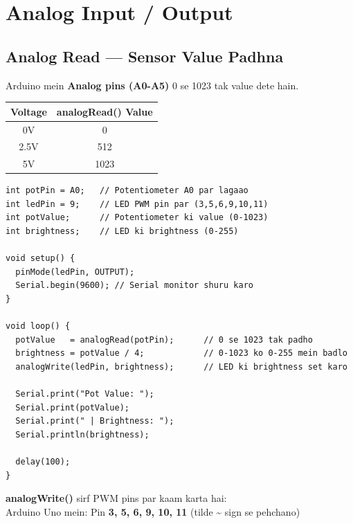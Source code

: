 \documentclass[12pt,a4paper]{article}
\begin{document}
\newpage

\section{Analog Input / Output}

\subsection{Analog Read — Sensor Value Padhna}

Arduino mein \textbf{Analog pins (A0-A5)} 0 se 1023 tak value dete hain.

\begin{center}
\begin{tabular}{|c|c|}
\hline
\rowcolor{arduinoBlue!20}
\textbf{Voltage} & \textbf{analogRead() Value} \\
\hline
0V & 0 \\
\hline
2.5V & 512 \\
\hline
5V & 1023 \\
\hline
\end{tabular}
\end{center}

\begin{tcolorbox}[codebox=Example 5: Potentiometer (Variable Resistor) se LED Control]
\begin{lstlisting}
int potPin = A0;   // Potentiometer A0 par lagaao
int ledPin = 9;    // LED PWM pin par (3,5,6,9,10,11)
int potValue;      // Potentiometer ki value (0-1023)
int brightness;    // LED ki brightness (0-255)

void setup() {
  pinMode(ledPin, OUTPUT);
  Serial.begin(9600); // Serial monitor shuru karo
}

void loop() {
  potValue   = analogRead(potPin);      // 0 se 1023 tak padhо
  brightness = potValue / 4;            // 0-1023 ko 0-255 mein badlo
  analogWrite(ledPin, brightness);      // LED ki brightness set karo

  Serial.print("Pot Value: ");
  Serial.print(potValue);
  Serial.print(" | Brightness: ");
  Serial.println(brightness);

  delay(100);
}
\end{lstlisting}
\end{tcolorbox}

\begin{tcolorbox}[notebox]
\textbf{analogWrite()} sirf PWM pins par kaam karta hai:\\
Arduino Uno mein: Pin \textbf{3, 5, 6, 9, 10, 11} (tilde \textasciitilde{} sign se pehchano)
\end{tcolorbox}
\end{document}
